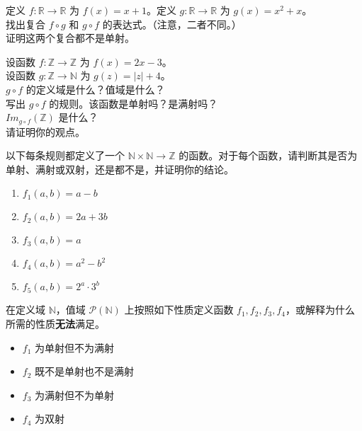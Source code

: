 \begin{exercise}
    定义 $f : \mathbb{R} \to \mathbb{R}$ 为 $f(x) = x + 1$。定义 $g : \mathbb{R} \to \mathbb{R}$ 为 $g(x) = x^2 + x$。\\
    找出复合 $f \circ g$ 和 $g \circ f$ 的表达式。（注意，二者不同。）\\
    证明这两个复合都不是单射。
\end{exercise}

\begin{exercise}
    设函数 $f : \mathbb{Z} \to \mathbb{Z}$ 为 $f(x) = 2x - 3$。\\
    设函数 $g : \mathbb{Z} \to \mathbb{N}$ 为 $g(z) = |z| + 4$。\\
    $g \circ f$ 的定义域是什么？值域是什么？\\
    写出 $g \circ f$ 的规则。该函数是单射吗？是满射吗？\\
    $Im_{g \circ f}(\mathbb{Z})$ 是什么？\\
    请证明你的观点。
\end{exercise}

\begin{exercise}
    以下每条规则都定义了一个 $\mathbb{N} \times \mathbb{N} \to \mathbb{Z}$ 的函数。对于每个函数，请判断其是否为单射、满射或双射，还是都不是，并证明你的结论。
    \begin{enumerate}[label=(\alph*)]
        \item $f_1(a, b) = a - b$
        \item $f_2(a, b) = 2a + 3b$
        \item $f_3(a, b) = a$
        \item $f_4(a, b) = a^2 - b^2$
        \item $f_5(a, b) = 2^a \cdot 3^b$
    \end{enumerate}
\end{exercise}

\begin{exercise}
    在定义域 $\mathbb{N}$，值域 $\mathcal{P}(\mathbb{N})$ 上按照如下性质定义函数 $f_1, f_2, f_3, f_4$，或解释为什么所需的性质\textbf{无法}满足。
    \begin{itemize}
        \item $f_1$ 为单射但不为满射
        \item $f_2$ 既不是单射也不是满射
        \item $f_3$ 为满射但不为单射
        \item $f_4$ 为双射
    \end{itemize}
\end{exercise}

